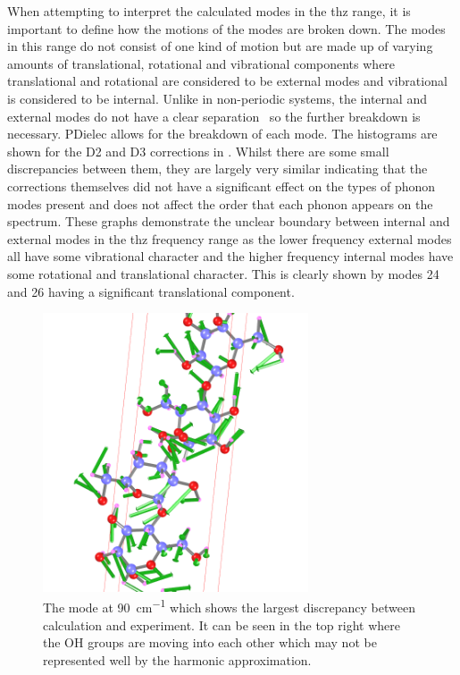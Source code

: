 When attempting to interpret the calculated modes in the \acrshort{thz} range, it is important to define how the motions of the modes are broken down. The modes in this range do not consist of one kind of motion but are made up of varying amounts of translational, rotational and vibrational components where translational and rotational are considered to be external modes and vibrational is considered to be internal. Unlike in non-periodic systems, the internal and external modes do not have a clear separation~\cite{Jepsen2007} so the further breakdown is necessary. PDielec allows for the breakdown of each mode. The histograms are shown for the D2 and D3 corrections in . Whilst there are some small discrepancies between them, they are largely very similar indicating that the corrections themselves did not have a significant effect on the types of phonon modes present and does not affect the order that each phonon appears on the spectrum. These graphs demonstrate the unclear boundary between internal and external modes in the \acrshort{thz} frequency range as the lower frequency external modes all have some vibrational character and the higher frequency internal modes have some rotational and translational character. This is clearly shown by modes 24 and 26 having a significant translational component.

\begin{figure}[t]
    \centering
    \includegraphics[width=0.7\textwidth]{Figures/Analysis/IVDW/mode13.png}
    \captionsetup{font = footnotesize, justification = centering}
    \caption[The Mode which shows the Largest Discrepancy between Calculation and Experiment]{The mode at \SI{90}{cm^{-1}} which shows the largest discrepancy between calculation and experiment. It can be seen in the top right where the OH groups are moving into each other which may not be represented well by the harmonic approximation.}
    \label{fig:mode13_anharm}
\end{figure}

